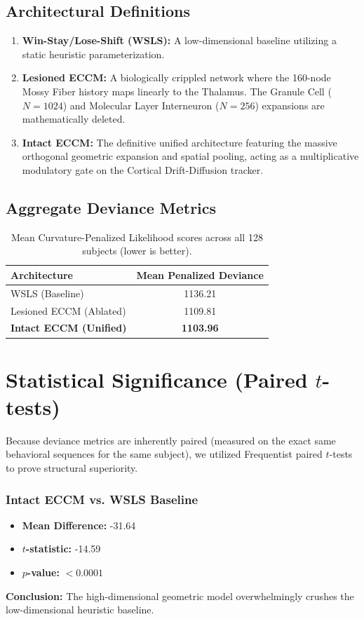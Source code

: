 \documentclass[11pt,a4paper]{article}
\begin{document}
\subsection{Architectural Definitions}
\begin{enumerate}
    \item \textbf{Win-Stay/Lose-Shift (WSLS):} A low-dimensional baseline utilizing a static heuristic parameterization.
    \item \textbf{Lesioned ECCM:} A biologically crippled network where the 160-node Mossy Fiber history maps linearly to the Thalamus. The Granule Cell ($N=1024$) and Molecular Layer Interneuron ($N=256$) expansions are mathematically deleted.
    \item \textbf{Intact ECCM:} The definitive unified architecture featuring the massive orthogonal geometric expansion and spatial pooling, acting as a multiplicative modulatory gate on the Cortical Drift-Diffusion tracker.
\end{enumerate}

\subsection{Aggregate Deviance Metrics}
\begin{table}[h!]
    \centering
    \begin{tabular}{lc}
        \toprule
        \textbf{Architecture} & \textbf{Mean Penalized Deviance} \\
        \midrule
        WSLS (Baseline) & 1136.21 \\ 
        Lesioned ECCM (Ablated) & 1109.81 \\ 
        \textbf{Intact ECCM (Unified)} & \textbf{1103.96} \\ 
        \bottomrule
    \end{tabular}
    \caption{Mean Curvature-Penalized Likelihood scores across all 128 subjects (lower is better).}
\end{table}

\section{Statistical Significance (Paired $t$-tests)}
Because deviance metrics are inherently paired (measured on the exact same behavioral sequences for the same subject), we utilized Frequentist paired $t$-tests to prove structural superiority.

\subsubsection*{Intact ECCM vs. WSLS Baseline}
\begin{itemize}
    \item \textbf{Mean Difference:} -31.64 
    \item \textbf{$t$-statistic:} -14.59 
    \item \textbf{$p$-value:} $< 0.0001$ 
\end{itemize}
\textbf{Conclusion:} The high-dimensional geometric model overwhelmingly crushes the low-dimensional heuristic baseline.
\end{document}
